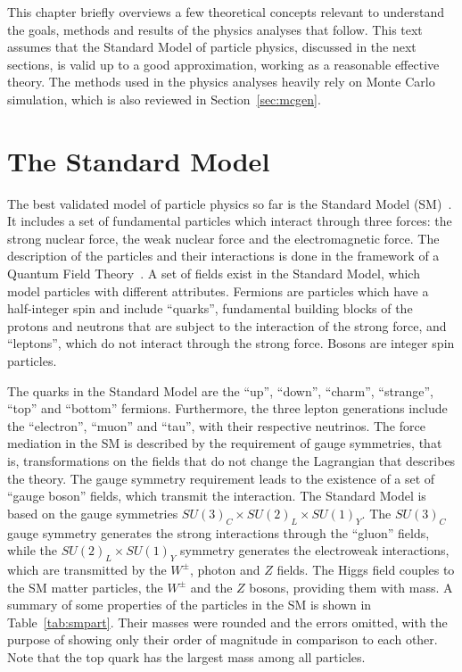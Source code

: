 

This chapter briefly overviews a few theoretical concepts relevant to understand the goals, methods
and results of the physics analyses that follow.
This text assumes that the Standard Model of particle physics, discussed in the next sections,
is valid up to a good approximation, working as a reasonable effective theory.
The methods used in the physics analyses heavily rely on Monte Carlo simulation, which is also reviewed in Section~\ref{sec:mcgen}.

\section{The Standard Model}

The best validated model of particle physics so far is the Standard Model (SM)~\cite{glashow,weinberg,gim,electroweak,politzer,asymptoticfreedom,freegauge,sm,thooft,thooft1,higgs,englert,guralnik,cabbibo,kobayashi}. It includes a set of fundamental particles which interact through three forces:
the strong nuclear force, the weak nuclear force and the electromagnetic force. The description of the particles and their interactions
is done in the framework of a Quantum Field Theory~\cite{qft}.
A set of fields exist in the Standard Model, which model particles with different attributes. Fermions are particles which have a half-integer spin and
include ``quarks'', fundamental building blocks of the protons and neutrons that are subject to the interaction of the strong force, and ``leptons'', which do not
interact through the strong force.
Bosons are integer spin particles.

The quarks in the Standard Model are
the ``up'', ``down'', ``charm'', ``strange'', ``top'' and ``bottom'' fermions.
Furthermore, the three lepton generations include the ``electron'', ``muon'' and ``tau'', with
their respective neutrinos.
The force mediation in the SM is described by the requirement of gauge symmetries, that is, transformations on the fields that do not change the Lagrangian that describes the
theory.
The gauge symmetry requirement leads to the existence of a set of ``gauge boson'' fields, which transmit the interaction.
The Standard Model is
based on the gauge symmetries $SU(3)_C \times SU(2)_L \times SU(1)_Y$.
The $SU(3)_C$ gauge symmetry generates the strong interactions through the ``gluon'' fields,
while the $SU(2)_L \times SU(1)_Y$ symmetry generates the electroweak interactions, which are
transmitted by the
$W^{\pm}$, photon and $Z$ fields.
The Higgs field couples to the SM matter particles, the $W^{\pm}$ and the $Z$ bosons,
providing them with mass.
A summary of some properties of the particles in the SM is shown in Table~\ref{tab:smpart}.
Their masses were rounded and the errors omitted, with the purpose of showing only their order of magnitude in comparison to each other.
Note that the top quark has the largest mass among all particles.

